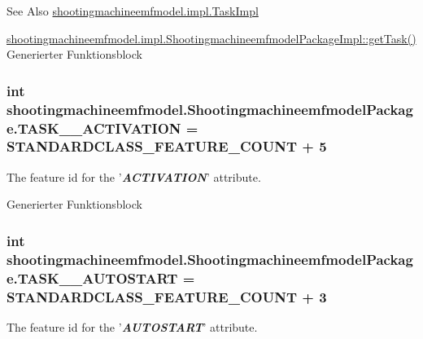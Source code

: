 \begin{DoxySeeAlso}{See Also}
\hyperlink{classshootingmachineemfmodel_1_1impl_1_1_task_impl}{shootingmachineemfmodel.\-impl.\-Task\-Impl} 

\hyperlink{classshootingmachineemfmodel_1_1impl_1_1_shootingmachineemfmodel_package_impl_a4cb0a1f2bdfdc0313e25e54cb0e15c45}{shootingmachineemfmodel.\-impl.\-Shootingmachineemfmodel\-Package\-Impl\-::get\-Task()} Generierter Funktionsblock 
\end{DoxySeeAlso}
\hypertarget{interfaceshootingmachineemfmodel_1_1_shootingmachineemfmodel_package_acaa0d423bb2cc890173d67409494bd3d}{
\subsubsection[{T\-A\-S\-K\-\_\-\-\_\-\-A\-C\-T\-I\-V\-A\-T\-I\-O\-N}]{\setlength{\rightskip}{0pt plus 5cm}int shootingmachineemfmodel.\-Shootingmachineemfmodel\-Package.\-T\-A\-S\-K\-\_\-\-\_\-\-A\-C\-T\-I\-V\-A\-T\-I\-O\-N = {\bf S\-T\-A\-N\-D\-A\-R\-D\-C\-L\-A\-S\-S\-\_\-\-F\-E\-A\-T\-U\-R\-E\-\_\-\-C\-O\-U\-N\-T} + 5}}\label{interfaceshootingmachineemfmodel_1_1_shootingmachineemfmodel_package_acaa0d423bb2cc890173d67409494bd3d}
The feature id for the '{\itshape {\bfseries A\-C\-T\-I\-V\-A\-T\-I\-O\-N}}' attribute.

Generierter Funktionsblock  \hypertarget{interfaceshootingmachineemfmodel_1_1_shootingmachineemfmodel_package_aec71228b1f838eaeb86efe350e5b1a4f}{
\subsubsection[{T\-A\-S\-K\-\_\-\-\_\-\-A\-U\-T\-O\-S\-T\-A\-R\-T}]{\setlength{\rightskip}{0pt plus 5cm}int shootingmachineemfmodel.\-Shootingmachineemfmodel\-Package.\-T\-A\-S\-K\-\_\-\-\_\-\-A\-U\-T\-O\-S\-T\-A\-R\-T = {\bf S\-T\-A\-N\-D\-A\-R\-D\-C\-L\-A\-S\-S\-\_\-\-F\-E\-A\-T\-U\-R\-E\-\_\-\-C\-O\-U\-N\-T} + 3}}\label{interfaceshootingmachineemfmodel_1_1_shootingmachineemfmodel_package_aec71228b1f838eaeb86efe350e5b1a4f}
The feature id for the '{\itshape {\bfseries A\-U\-T\-O\-S\-T\-A\-R\-T}}' attribute.

